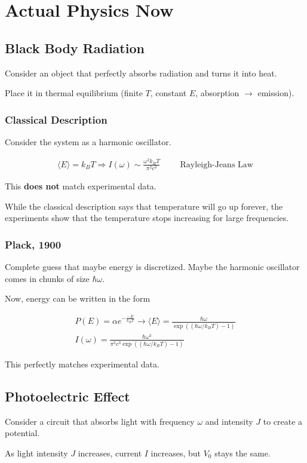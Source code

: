 \documentclass[fleqn]{report}
\newcommand{\hp}{\hspace{1cm}}
\newcommand{\equations} [1] {
\begin{gather*}
#1
\end{gather*}
}
\begin{document}
\chapter{Actual Physics Now}

\section{Black Body Radiation}
Consider an object that perfectly absorbs radiation and turns it into heat. 

Place it in thermal equilibrium 
(finite $T$, constant $E$, absorption $\rightarrow$ emission).

\subsection{Classical Description}
Consider the system as a harmonic oscillator. 

\equations{
    \langle E \rangle = k_B T
    \Rightarrow 
    I(\omega)
    \sim 
    \frac{\omega^2 k_B T}{\pi^2 c^3}
    \hp
    \textrm{Rayleigh-Jeans Law}
}

This \textbf{does not} match experimental data. 

While the classical description says that temperature will go up forever, the 
experiments show that the temperature stops increasing for large frequencies.

\subsection{Plack, 1900}
Complete guess that maybe energy is discretized. Maybe the harmonic oscillator 
comes in chunks of size $\hbar \omega$.

Now, energy can be written in the form 
\equations{
    P(E)
    =
    \alpha e^{- \frac{-E}{k_B T}}
    \longrightarrow 
    \langle E \rangle 
    =
    \frac{\hbar \omega}{\exp((\hbar \omega / k_B T) - 1)}
    \\
    I(\omega)
    =
    \frac{\hbar \omega^3}{\pi^2 c^3 \exp((\hbar \omega / k_B T) - 1)}
}
This perfectly matches experimental data.

\section{Photoelectric Effect}
Consider a circuit that absorbs light with frequency $\omega$ and intensity $J$
to create a potential.

As light intensity $J$ increases, current $I$ increases, but $V_0$ stays the same. 
\end{document}

